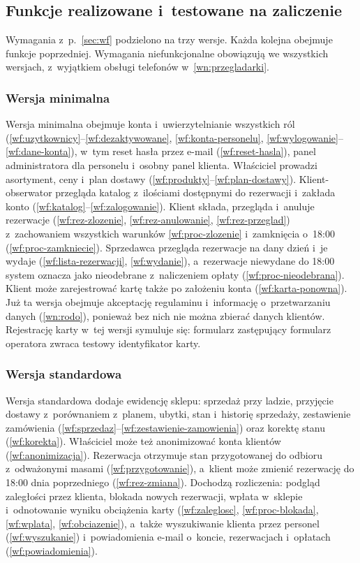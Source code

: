 \documentclass[12pt,a4paper,oneside]{article}
\newcounter{pu}
\begin{document}
\subsection{Funkcje realizowane i~testowane na zaliczenie}
\label{sec:wersje}

Wymagania z~p.~\ref{sec:wf} podzielono na trzy wersje. Każda kolejna obejmuje funkcje poprzedniej. Wymagania niefunkcjonalne obowiązują we wszystkich wersjach, z~wyjątkiem obsługi telefonów w~\ref{wn:przegladarki}.

\subsubsection{Wersja minimalna}

Wersja minimalna obejmuje konta i~uwierzytelnianie wszystkich ról (\ref{wf:uzytkownicy}--\ref{wf:dezaktywowane}, \ref{wf:konta-personelu}, \ref{wf:wylogowanie}--\ref{wf:dane-konta}), w~tym reset hasła przez e-mail (\ref{wf:reset-hasla}), panel administratora dla personelu i~osobny panel klienta. Właściciel prowadzi asortyment, ceny i~plan dostawy (\ref{wf:produkty}--\ref{wf:plan-dostawy}). Klient-obserwator przegląda katalog z~ilościami dostępnymi do rezerwacji i~zakłada konto (\ref{wf:katalog}--\ref{wf:zalogowanie}). Klient składa, przegląda i~anuluje rezerwacje (\ref{wf:rez-zlozenie}, \ref{wf:rez-anulowanie}, \ref{wf:rez-przeglad}) z~zachowaniem wszystkich warunków \ref{wf:proc-zlozenie} i~zamknięcia o~18:00 (\ref{wf:proc-zamkniecie}). Sprzedawca przegląda rezerwacje na dany dzień i~je wydaje (\ref{wf:lista-rezerwacji}, \ref{wf:wydanie}), a~rezerwacje niewydane do 18:00 system oznacza jako nieodebrane z~naliczeniem opłaty (\ref{wf:proc-nieodebrana}). Klient może zarejestrować kartę także po założeniu konta (\ref{wf:karta-ponowna}). Już ta wersja obejmuje akceptację regulaminu i~informację o~przetwarzaniu danych (\ref{wn:rodo}), ponieważ bez nich nie można zbierać danych klientów. Rejestrację karty w~tej wersji symuluje się: formularz zastępujący formularz operatora zwraca testowy identyfikator karty.

\subsubsection{Wersja standardowa}

Wersja standardowa dodaje ewidencję sklepu: sprzedaż przy ladzie, przyjęcie dostawy z~porównaniem z~planem, ubytki, stan i~historię sprzedaży, zestawienie zamówienia (\ref{wf:sprzedaz}--\ref{wf:zestawienie-zamowienia}) oraz korektę stanu (\ref{wf:korekta}). Właściciel może też anonimizować konta klientów (\ref{wf:anonimizacja}). Rezerwacja otrzymuje stan przygotowanej do odbioru z~odważonymi masami (\ref{wf:przygotowanie}), a~klient może zmienić rezerwację do 18:00 dnia poprzedniego (\ref{wf:rez-zmiana}). Dochodzą rozliczenia: podgląd zaległości przez klienta, blokada nowych rezerwacji, wpłata w~sklepie i~odnotowanie wyniku obciążenia karty (\ref{wf:zaleglosc}, \ref{wf:proc-blokada}, \ref{wf:wplata}, \ref{wf:obciazenie}), a~także wyszukiwanie klienta przez personel (\ref{wf:wyszukanie}) i~powiadomienia e-mail o~koncie, rezerwacjach i~opłatach (\ref{wf:powiadomienia}).
\end{document}
